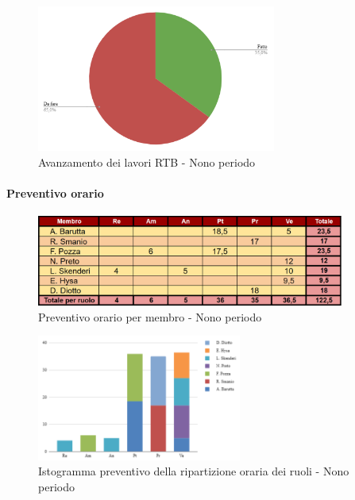 \begin{figure}[H]
    \centering
    \begin{minipage}[b]{0.70\textwidth}
        \centering
        \includegraphics[width=0.7\textwidth]{../Images/avanzamento9Periodo.png}
        \caption{Avanzamento dei lavori RTB - Nono periodo}
        \label{fig:Avanzamento_RTB_9}
    \end{minipage}
\end{figure}

\paragraph{Preventivo orario}

\begin{figure}[H] 
    \centering
    \includegraphics[width=0.9\textwidth]{../Images/preventivoOrario9Periodo.png}
    \caption{Preventivo orario per membro - Nono periodo}
    \label{fig:Preventivo_orario_9}
\end{figure}

\begin{figure}[H]
    \centering
    \includegraphics[width=0.6\textwidth]{../Images/preventivoDivisioneRuoli9Periodo.png}
    \caption{Istogramma preventivo della ripartizione oraria dei ruoli - Nono periodo}
    \label{fig:Preventivo_ripartizione_oraria_9}
\end{figure}

